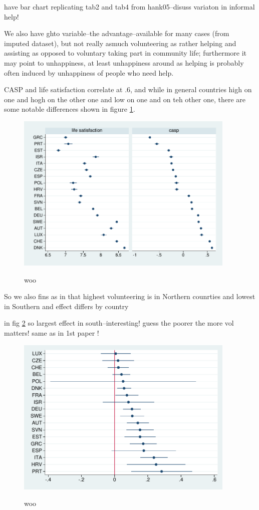 \documentclass[10pt, letterpaper]{article}
\begin{document}
\begin{spacing}{1.4}
have bar chart replicating tab2 and tab4 from hank05--disuss variaton in
informal help!

We also have ghto variable--the advantage--available for many cases (from
imputed dataset), but not really asmuch volunteering as rather helping and
assisting as opposed to voluntary taking part in community life; furthermore it
may point to unhappiness, at least unhappiness around as helping is probably
often induced by unhappiness of people who need help.  


CASP and life satisfaction correlate at .6, and while in general countries high
on one and hogh on the other one and low on one and on teh other one, there are
some notable differences shown in figure \ref{ls-casp-means}.

\begin{figure}[H]
 \includegraphics[height=3in]{tmp/ls-casp-means.pdf}\centering\label{ls-casp-means}
\caption{woo}
\end{figure}

So we also fins as in \citet{haski09} that highest volunteering is in Northern
counrties and lowest in Southern and effect differs by country


in fig \ref{reg-volCha}
so largest effect in south--interesting! guess the poorer the more vol matters!
same as in 1st paper !

\begin{figure}[H]
 \includegraphics[height=3in]{tmp/reg-volCha.pdf}\centering\label{reg-volCha}
\caption{woo}
\end{figure}



\end{spacing}
\end{document}
